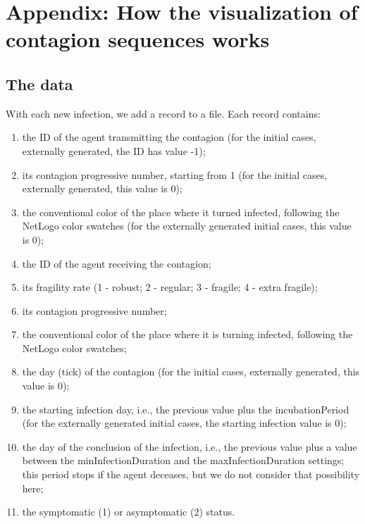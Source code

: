 \documentclass[graybox]{svmult}
\begin{document}
\section{Appendix: How the visualization of contagion sequences works}
\label{appHowItWorks}

\subsection{The data}

With each new infection, we add a record to a file. Each record contains:
\begin{enumerate}\addtocounter{enumi}{-1}
\setlength{\itemsep}{0pt}
\item the ID of the agent transmitting the contagion (for the initial cases, externally generated, the ID has value -1);
\item its contagion progressive number, starting from 1 (for the initial cases, externally generated, this value is 0);
\item the conventional color of the place where it turned infected, following the NetLogo color swatches (for the externally generated initial cases, this value is 0);
\item the ID of the agent receiving the contagion;
\item its fragility rate (1 - robust; 2 - regular; 3 - fragile; 4 - extra fragile);
\item its contagion progressive number;
\item the conventional color of the place where it is turning infected, following the NetLogo color swatches;
\item the day (tick) of the contagion (for the initial cases, externally generated, this value is 0);
\item the starting infection day, i.e., the previous value plus the incubationPeriod (for the externally generated initial cases, the starting infection value is 0);
\item the day of the conclusion of the infection, i.e., the previous value plus a value between the minInfectionDuration and the maxInfectionDuration settings; this period stops if the agent deceases, but we do not consider that possibility here;
\item the symptomatic (1) or asymptomatic (2) status.
\end{enumerate}
\end{document}
